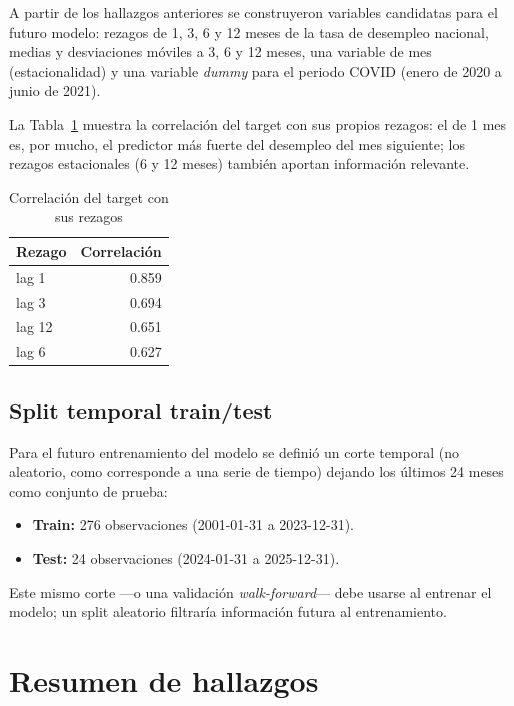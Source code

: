 \documentclass[11pt,a4paper]{article}
\begin{document}
A partir de los hallazgos anteriores se construyeron variables candidatas para el futuro modelo: rezagos de 1, 3, 6 y 12 meses de la tasa de desempleo nacional, medias y desviaciones móviles a 3, 6 y 12 meses, una variable de mes (estacionalidad) y una variable \textit{dummy} para el periodo COVID (enero de 2020 a junio de 2021).

La Tabla~\ref{tab:lags} muestra la correlación del target con sus propios rezagos: el de 1 mes es, por mucho, el predictor más fuerte del desempleo del mes siguiente; los rezagos estacionales (6 y 12 meses) también aportan información relevante.

\begin{table}[H]
    \centering
    \caption{Correlación del target con sus rezagos}
    \label{tab:lags}
    \begin{tabular}{lr}
        \toprule
        \textbf{Rezago} & \textbf{Correlación} \\
        \midrule
        lag 1  & 0.859 \\
        lag 3  & 0.694 \\
        lag 12 & 0.651 \\
        lag 6  & 0.627 \\
        \bottomrule
    \end{tabular}
\end{table}

\subsection{Split temporal train/test}

Para el futuro entrenamiento del modelo se definió un corte temporal (no aleatorio, como corresponde a una serie de tiempo) dejando los últimos 24 meses como conjunto de prueba:

\begin{itemize}
    \item \textbf{Train:} 276 observaciones (2001-01-31 a 2023-12-31).
    \item \textbf{Test:} 24 observaciones (2024-01-31 a 2025-12-31).
\end{itemize}

Este mismo corte —o una validación \textit{walk-forward}— debe usarse al entrenar el modelo; un split aleatorio filtraría información futura al entrenamiento.

\newpage
\section{Resumen de hallazgos}
\end{document}
